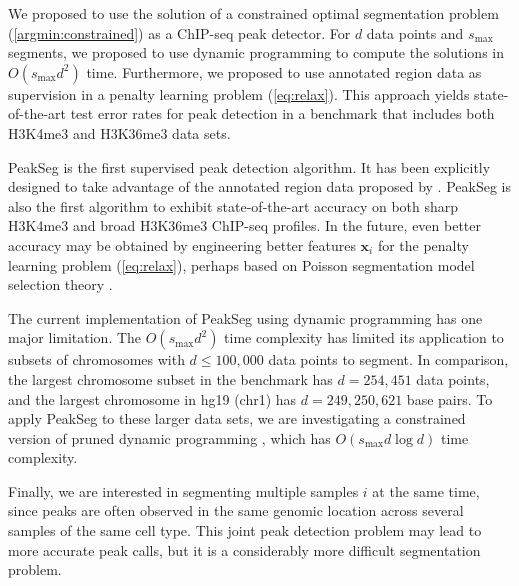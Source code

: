 \documentclass{article}
\begin{document}
We proposed to use the solution of a constrained optimal segmentation
problem (\ref{argmin:constrained}) as a ChIP-seq peak detector. For
$d$ data points and $s_{\text{max}}$ segments, we proposed to use
dynamic programming to compute the solutions in $O(s_{\text{max}} d^2)$
time. Furthermore, we proposed to use annotated region data as
supervision in a penalty learning problem (\ref{eq:relax}). This
approach yields state-of-the-art test error rates for peak detection
in a benchmark that includes both H3K4me3 and H3K36me3 data
sets.

PeakSeg is the first supervised peak detection algorithm. It has been
explicitly designed to take advantage of the annotated region data
proposed by \citet{hocking2014visual}. PeakSeg is also the first
algorithm to exhibit state-of-the-art accuracy on both sharp H3K4me3
and broad H3K36me3 ChIP-seq profiles. In the future, even better
accuracy may be obtained by engineering better features $\mathbf x_i$
for the penalty learning problem (\ref{eq:relax}), perhaps based on
Poisson segmentation model selection theory
\citep{cleynen2013segmentation}.

The current implementation of PeakSeg using dynamic programming has
one major limitation. The $O(s_{\text{max}} d^2)$ time complexity has
limited its application to subsets of chromosomes with $d\leq 100,000$
data points to segment. In comparison, the largest chromosome subset
in the benchmark has $d=254,451$ data points, and the largest
chromosome in hg19 (chr1) has $d=249,250,621$ base pairs. To apply
PeakSeg to these larger data sets, we are investigating a constrained
version of pruned dynamic programming \citep{pruned-dp, Segmentor},
which has $O(s_{\text{max}} d\log d)$ time complexity.

Finally, we are interested in segmenting multiple samples $i$ at the
same time, since peaks are often observed in the same genomic location
across several samples of the same cell type. This joint peak
detection problem may lead to more accurate peak calls, but it is a
considerably more difficult segmentation problem.




\end{document}
